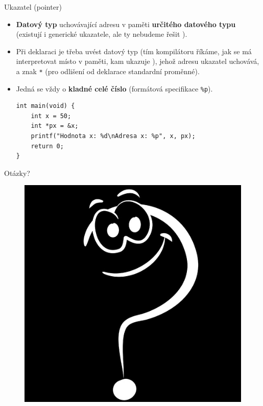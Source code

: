 \documentclass[14pt,aspectratio=169]{beamer}
\begin{document}
    \begin{frame}[t,fragile]{Ukazatel (pointer)}
        \begin{itemize}
            \item \textbf{Datový typ} uchovávající adresu v paměti \textbf{určitého datového typu} (existují i generické ukazatele, ale ty nebudeme řešit ).
            \item Při deklaraci je třeba uvést datový typ (tím kompilátoru říkáme, jak se má interpretovat místo v paměti, kam ukazuje ), jehož adresu ukazatel uchovává, a znak \texttt{*} (pro odlišení od deklarace standardní proměnné).
            \item Jedná se vždy o \textbf{kladné celé číslo} (formátová specifikace \texttt{\%p}).
            \begin{lstlisting}
int main(void) {
    int x = 50;
    int *px = &x;
    printf("Hodnota x: %d\nAdresa x: %p", x, px);
    return 0;
}
            \end{lstlisting}
        \end{itemize}
    \end{frame}

    \begin{frame}{Otázky?}
        \begin{figure}
            \centering
            \includegraphics[scale=.4]{images/discussion_inverted.png}
        \end{figure}
    \end{frame}
\end{document}

